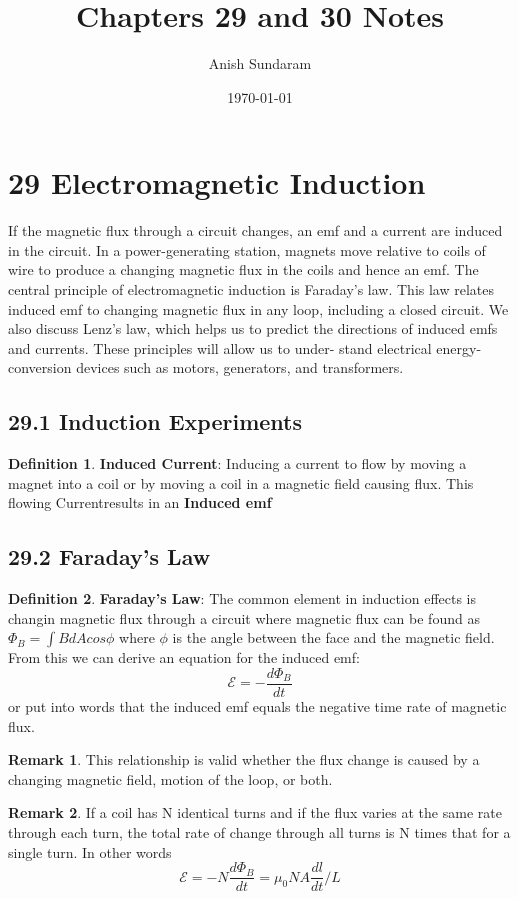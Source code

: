 \documentclass[12pt]{amsart}
\title{Chapters 29 and 30 Notes}
\author{Anish Sundaram}
\date{\today}
\theoremstyle{definition}
\newtheorem{definition}{Definition} %
\newtheorem*{remark}{Remark}        %
\numberwithin{equation}{theorem}    %
\begin{document}
\maketitle

\tableofcontents

\section*{29 Electromagnetic Induction}

If the magnetic flux through a circuit changes, an emf and a current are induced in the circuit. In a power-generating station, magnets move relative to coils of wire to produce a changing magnetic flux in the coils and hence an emf.
The central principle of electromagnetic induction is Faraday’s law. This law relates induced emf to changing magnetic flux in any loop, including a closed circuit. We also discuss Lenz’s law, which helps us to predict the directions of induced emfs and currents. These principles will allow us to under- stand electrical energy-conversion devices such as motors, generators, and transformers.


\subsection*{29.1 Induction Experiments}

\begin{definition}
    \textbf{Induced Current}:
    Inducing a current to flow by moving a magnet into a coil or by moving a coil
    in a magnetic field causing flux. This flowing Currentresults in an \textbf{Induced emf}
\end{definition}

\subsection*{29.2 Faraday's Law}

\begin{definition}
    \textbf{Faraday’s Law}:
    The common element in induction effects is changin magnetic flux through a circuit
    where magnetic flux can be found as $\Phi_B = \int B dAcos\phi$ where $\phi$ is the angle between the face and the magnetic field. From this we can derive an equation for the induced emf: 
    $$\mathcal{E} = -\frac{d\Phi_B}{dt}$$ or put into words that the induced emf equals the negative time rate of magnetic flux.
    \begin{remark}
        This relationship is valid whether the flux change is caused by a changing magnetic field, motion of the loop, or both.
    \end{remark}
    \begin{remark}
    If a coil has N identical turns and if the flux varies at the same rate through each turn, the total rate of change through all turns is N times that for a single turn. In other words $$\mathcal{E} = -N\frac{d\Phi_B}{dt} = \mu_0NA\frac{dl}{dt}/L$$
    \end{remark}
\end{definition}
\end{document}
